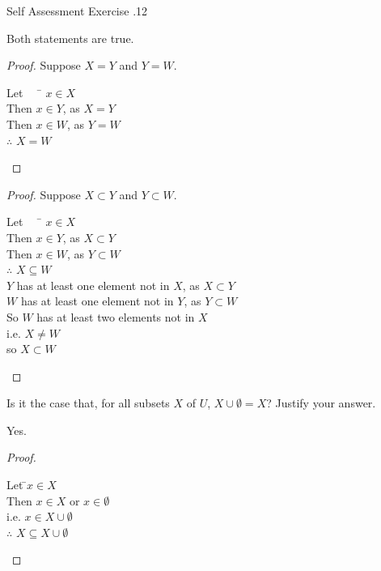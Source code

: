 \documentclass[\main/notes.tex]{subfiles}
\begin{document}
\begin{exercise}{Self Assessment Exercise \thechapter.12}
\begin{questions}
\begin{answer}
							Both statements are true.
							\begin{indentparagraph}
								\begin{proof}
									Suppose $X = Y$ and $Y = W$.
									\begin{tabbing}
										Let $\quad$ \= $x \in X$\\
										Then \> $x \in Y$, as $X = Y$\\
										Then \> $x \in W$, as $Y = W$\\
										$\therefore$ \> $X = W$
									\end{tabbing}
								\end{proof}
								\begin{proof}
									Suppose $X \subset Y$ and $Y \subset W$.
									\begin{tabbing}
										Let $\quad$ \= $x \in X$\\
										Then \> $x \in Y$, as $X \subset Y$\\
										Then \> $x \in W$, as $Y \subset W$\\
										$\therefore$ \> $X \subseteq W$\\
										\> $Y$ has at least one element not in $X$, as $X \subset Y$\\
										\> $W$ has at least one element not in $Y$, as $Y \subset W$\\
										So \> $W$ has at least two elements not in $X$\\
										i.e. $X \neq W$\\
										so $X \subset W$
									\end{tabbing}
								\end{proof}
							\end{indentparagraph}
						\end{answer}
					\pagebreak
					\item Is it the case that, for all subsets $X$ of $U$, $X \cup \emptyset = X$? Justify your answer.\\
						\begin{answer}
							Yes.
							\begin{proof}
								$ $
								\begin{tabbing}
									Let \quad \=$x \in X$\\
									Then \> $x \in X$ or $x \in \emptyset$\\
									i.e. \> $x \in X \cup \emptyset$\\
									$\therefore$ \> $X \subseteq X \cup \emptyset$
								\end{tabbing}

\end{proof}
\end{answer}
\end{questions}
\end{exercise}
\end{document}

